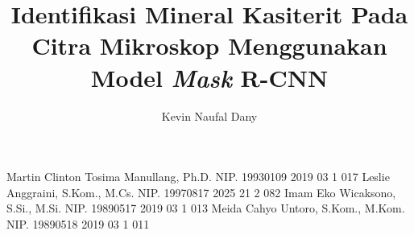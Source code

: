 \documentclass[article]{report} %
\begin{document}
    
    \title{Identifikasi Mineral Kasiterit Pada Citra Mikroskop Menggunakan Model \textit{Mask} R-CNN}
    
   \author{Kevin Naufal Dany}		%
	
	\dosbingA%
		{Martin Clinton Tosima Manullang, Ph.D.}%
		{NIP. 19930109 2019 03 1 017}				%
	\dosbingB%
		{Leslie Anggraini, S.Kom., M.Cs.}%
		{NIP. 19970817 2025 21 2 082}		
	\pengujiA%
		{Imam Eko Wicaksono, S.Si., M.Si.}%
		{NIP. 19890517 2019 03 1 013}				%
	\pengujiB%
		{Meida Cahyo Untoro, S.Kom., M.Kom.}%
		{NIP. 19890518 2019 03 1 011}			%

	\sloppy %
    \setcounter{page}{1} %
\end{document}
